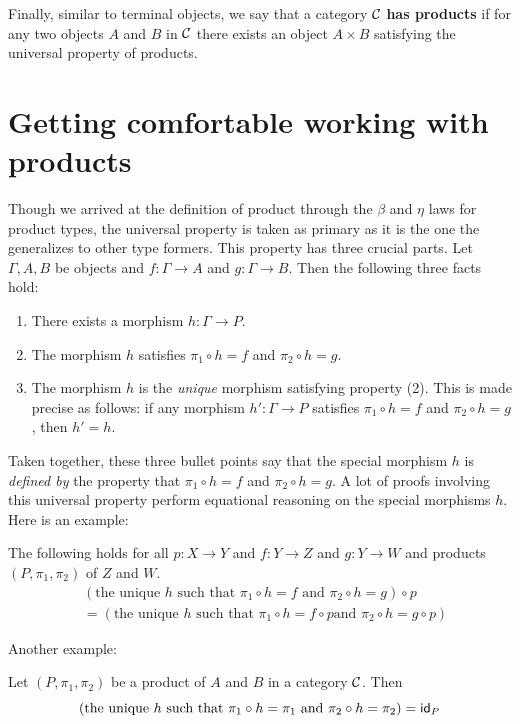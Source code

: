 Finally, similar to terminal objects, we say that a category $\mathcal C$ \textbf{has
products} if for any two objects $A$ and $B$ in $\mathcal C$ there exists an 
object $A \times B$ satisfying the universal property of products.

\section{Getting comfortable working with products}

Though we arrived at the definition of product through the \(\beta\)
and \(\eta\) laws for product types,
the universal property is taken as primary
as it is the one the generalizes to other type formers.
This property has three crucial parts.
Let \(\Gamma,A,B\) be objects and \(f : \Gamma \to A\)
and \(g : \Gamma \to B\). Then the following three facts hold:
\begin{enumerate}
\item There exists a morphism \(h : \Gamma \to P\).
\item The morphism \(h\) satisfies \(\pi_1 \circ h = f\) and \(\pi_2 \circ h = g\).
\item The morphism \(h\) is the \emph{unique} morphism satisfying property (2).
  This is made precise as follows:
  if any morphism \(h' : \Gamma \to P\) satisfies \(\pi_1 \circ h = f\)
  and \(\pi_2 \circ h = g\), then \(h' = h\).
\end{enumerate}
Taken together, these three bullet points say that
the special morphism \(h\) is \emph{defined by}
the property that \(\pi_1 \circ h = f\) and \(\pi_2 \circ h = g\).
A lot of proofs involving this universal property
perform equational reasoning
on the special morphisms \(h\).
Here is an example:
\begin{proposition}
  The following holds for all \(p : X \to Y\)
  and \(f : Y \to Z\) and \(g : Y \to W\)
  and products \((P,\pi_1,\pi_2)\) of \(Z\) and \(W\).
  \begin{align*}
  &(\text{the unique \(h\) such that \(\pi_1\circ h = f\) and \(\pi_2 \circ h = g\)})
  \circ p
  \\
  &= (\text{the unique \(h\) such that \(\pi_1 \circ h = f \circ p\)
  and \(\pi_2 \circ h = g \circ p\)})
  \end{align*}
\end{proposition}
Another example:
\begin{proposition}
  Let \((P,\pi_1,\pi_2)\) be a product of \(A\) and \(B\)
  in a category \(\mathcal C\).
  Then
  \[
  (\text{the unique \(h\) such that \(\pi_1\circ h = \pi_1\)
  and \(\pi_2 \circ h = \pi_2\)})
  = \mathsf{id}_{P}
  \]
\end{proposition}
